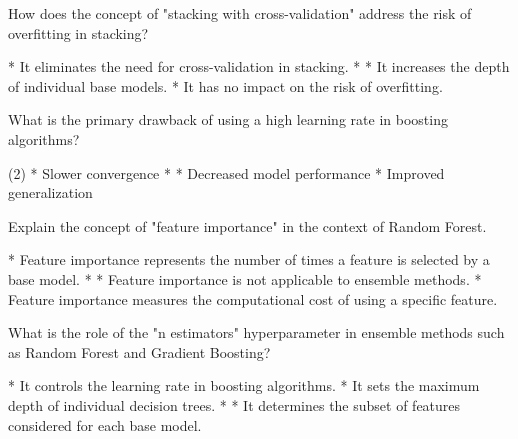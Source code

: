 \documentclass[10pt]{extarticle}
\begin{document}
\begin{exercise}
    How does the concept of "stacking with cross-validation" address the risk of overfitting in stacking?
    \begin{choice}
        * It eliminates the need for cross-validation in stacking.
        * 
        * It increases the depth of individual base models.
        * It has no impact on the risk of overfitting.
    \end{choice}
\end{exercise}
\begin{solution}
\end{solution}

\begin{exercise}
    What is the primary drawback of using a high learning rate in boosting algorithms?
    \begin{choice}(2)
        * Slower convergence
        * 
        * Decreased model performance
        * Improved generalization
    \end{choice}
\end{exercise}
\begin{solution}
\end{solution}

\begin{exercise}
    Explain the concept of "feature importance" in the context of Random Forest.
    \begin{choice}
        * Feature importance represents the number of times a feature is selected by a base model.
        * 
        * Feature importance is not applicable to ensemble methods.
        * Feature importance measures the computational cost of using a specific feature.
    \end{choice}
\end{exercise}
\begin{solution}
\end{solution}

\begin{exercise}
    What is the role of the "n estimators" hyperparameter in ensemble methods such as Random Forest and Gradient Boosting?
    \begin{choice}
        * It controls the learning rate in boosting algorithms.
        * It sets the maximum depth of individual decision trees.
        * 
        * It determines the subset of features considered for each base model.
    \end{choice}
\end{exercise}
\begin{solution}
\end{solution}
\end{document}
